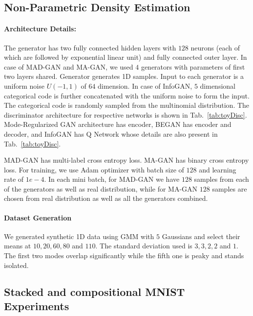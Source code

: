 \subsection{Non-Parametric Density Estimation}
\label{subsection:toy}
\paragraph{Architecture Details:}
The generator has two fully connected hidden layers with $128$ neurons (each of which are followed by exponential linear unit) and fully connected outer layer. In case of MAD-GAN and MA-GAN, we used $4$ generators with parameters of first two layers shared. Generator generates 1D samples. Input to each generator is a uniform noise $U(-1,1)$ of $64$ dimension. In case of InfoGAN, $5$ dimensional categorical code is further concatenated with the uniform noise to form the input. The categorical code is randomly sampled from the multinomial distribution. The discriminator architecture for respective networks is shown in Tab.~\ref{tab:toyDisc}. Mode-Regularized GAN architecture has encoder, BEGAN has encoder and decoder, and InfoGAN has Q Network whose details are also present in Tab.~\ref{tab:toyDisc}.

MAD-GAN has multi-label cross entropy loss. MA-GAN has binary cross entropy loss. For training, we use Adam optimizer with batch size of $128$ and learning rate of $1e-4$. In each mini batch, for MAD-GAN we have $128$ samples from each of the generators as well as real distribution, while for MA-GAN $128$ samples are chosen from real distribution as well as all the generators combined.

\paragraph{Dataset Generation}
We generated synthetic 1D data using GMM with $5$ Gaussians and select their means at $10, 20, 60, 80$ and $110$. The standard deviation used is $3,3,2,2$ and $1$. The first two modes overlap significantly while the fifth one is peaky and stands isolated.

\subsection{Stacked and compositional MNIST Experiments}
\label{subsection:stackMNIST}
